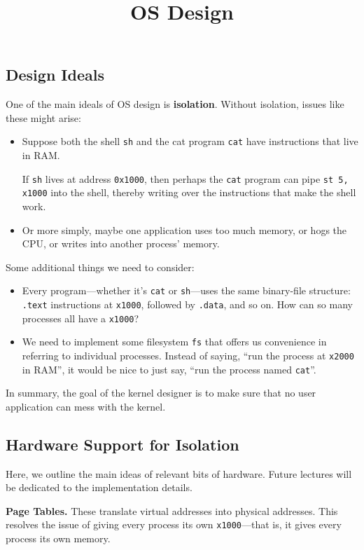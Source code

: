 \title{OS Design}



\subsection{Design Ideals}

One of the main ideals of OS design is \textbf{isolation}.
Without isolation, issues like these might arise:
\begin{itemize}
    \item Suppose both the shell \verb|sh| and the cat program \verb|cat|
    have instructions that live in RAM.
    
    If \verb|sh| lives at address \verb|0x1000|,
    then perhaps the \verb|cat| program can pipe
    \verb|st 5, x1000| into the shell,
    thereby writing over the instructions that make the shell work.
    \item Or more simply,
    maybe one application uses too much memory,
    or hogs the CPU,
    or writes into another process' memory.
\end{itemize}

Some additional things we need to consider:
\begin{itemize}
    \item Every program---whether it's \verb|cat| or \verb|sh|---uses
    the same binary-file structure:
    \verb|.text| instructions at \verb|x1000|,
    followed by \verb|.data|, and so on.
    How can so many processes all have a \verb|x1000|?
    \item We need to implement some filesystem \verb|fs|
    that offers us convenience in referring to
    individual processes.
    Instead of saying, ``run the process at \verb|x2000| in RAM'',
    it would be nice to just say, ``run the process named \verb|cat|''.
\end{itemize}
In summary, the goal of the kernel designer
is to make sure that no user application can mess with the kernel.

\subsection{Hardware Support for Isolation}

Here, we outline the main ideas of relevant bits of hardware.
Future lectures will be dedicated to the implementation details.

\textbf{Page Tables.}
These translate virtual addresses into physical addresses.
This resolves the issue of giving every process its own \verb|x1000|---that is,
it gives every process its own memory.

